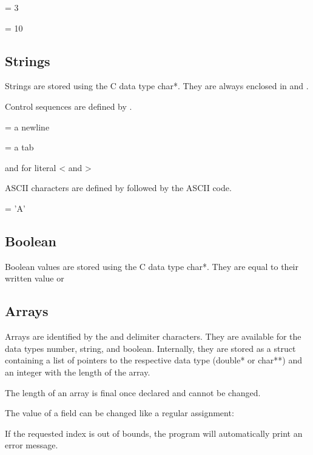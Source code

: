  = 3

 = 10

\subsection{Strings}
Strings are stored using the C data type char*. They are always enclosed in \greybox{<<} and \greybox{>>}.

 

Control sequences are defined by \greybox{\textasciitilde}.

 = a newline

 = a tab

\greybox{<<\textasciitilde < >>} and \greybox{<<\textasciitilde > >>} for literal < and >

ASCII characters are defined by  followed by the ASCII code.

 = 'A'

\subsection{Boolean}
Boolean values are stored using the C data type char*. They are equal to their written value
 or 

\subsection{Arrays}
Arrays are identified by the \greybox{\{} and \greybox{\}} delimiter characters. They are available for the data types number, string, and boolean. Internally, they are stored as a struct containing a  list of pointers to the respective data type (double* or char**) and an integer with the length of the array.

  

The length of an array is final once declared and cannot be changed.

The value of a field can be changed like a regular assignment:


If the requested index is out of bounds, the program will automatically print an error message.

